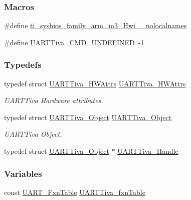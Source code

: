 \subsubsection*{Macros}
\begin{DoxyCompactItemize}
\item 
\#define \hyperlink{_u_a_r_t_tiva_8h_aaa17ecf48f5762e2e1bdb0bab8aacf0c}{ti\-\_\-sysbios\-\_\-family\-\_\-arm\-\_\-m3\-\_\-\-Hwi\-\_\-\-\_\-nolocalnames}
\item 
\#define \hyperlink{_u_a_r_t_tiva_8h_a86f57423618d7d4cd7a878f790ca932e}{U\-A\-R\-T\-Tiva\-\_\-\-C\-M\-D\-\_\-\-U\-N\-D\-E\-F\-I\-N\-E\-D}~-\/1
\end{DoxyCompactItemize}
\subsubsection*{Typedefs}
\begin{DoxyCompactItemize}
\item 
typedef struct \hyperlink{struct_u_a_r_t_tiva___h_w_attrs}{U\-A\-R\-T\-Tiva\-\_\-\-H\-W\-Attrs} \hyperlink{_u_a_r_t_tiva_8h_aac0b6013ab2db43424519532f9bf1ef6}{U\-A\-R\-T\-Tiva\-\_\-\-H\-W\-Attrs}
\begin{DoxyCompactList}\small\item\em U\-A\-R\-T\-Tiva Hardware attributes. \end{DoxyCompactList}\item 
typedef struct \hyperlink{struct_u_a_r_t_tiva___object}{U\-A\-R\-T\-Tiva\-\_\-\-Object} \hyperlink{_u_a_r_t_tiva_8h_a415fb8fc7172a69540bef335b0ba6735}{U\-A\-R\-T\-Tiva\-\_\-\-Object}
\begin{DoxyCompactList}\small\item\em U\-A\-R\-T\-Tiva Object. \end{DoxyCompactList}\item 
typedef struct \hyperlink{struct_u_a_r_t_tiva___object}{U\-A\-R\-T\-Tiva\-\_\-\-Object} $\ast$ \hyperlink{_u_a_r_t_tiva_8h_aaeecfa764f24fc2f566ca149dc091e78}{U\-A\-R\-T\-Tiva\-\_\-\-Handle}
\end{DoxyCompactItemize}
\subsubsection*{Variables}
\begin{DoxyCompactItemize}
\item 
const \hyperlink{struct_u_a_r_t___fxn_table}{U\-A\-R\-T\-\_\-\-Fxn\-Table} \hyperlink{_u_a_r_t_tiva_8h_a4b0dd67d0f6e16ffba1aa4ba8cf1db6f}{U\-A\-R\-T\-Tiva\-\_\-fxn\-Table}
\end{DoxyCompactItemize}


